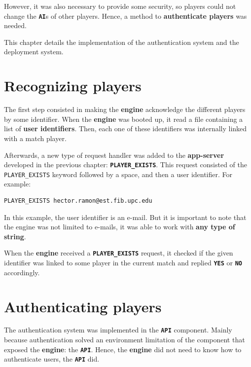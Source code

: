 \documentclass[a4paper,11pt,titlepage,abstract,numbers=noenddot,automark,mnsy,intlimits,rgb,dvipsnames]{report}
\begin{document}
However, it was also necessary to provide some security, so players could not change the \textbf{\texttt{AI}}s of other players. Hence,
a method to \textbf{authenticate players} was needed.

This chapter details the implementation of the authentication system and the deployment system.
\section{Recognizing players}
The first step consisted in making the \textbf{engine} acknowledge the different players by some identifier. When the \textbf{engine}
was booted up, it read a file containing a list of \textbf{user identifiers}. Then, each one of these identifiers was internally
linked with a match player.

Afterwards, a new type of request handler was added to the \textbf{app-server} developed in the previous chapter: \textbf{\texttt{PLAYER\_EXISTS}}.
This request consisted of the \texttt{PLAYER\_EXISTS} keyword followed by a space, and then a user identifier. For example:
\begin{verbatim}
PLAYER_EXISTS hector.ramon@est.fib.upc.edu
\end{verbatim}
In this example, the user identifier is an e-mail. But it is important to note that the engine was not limited to e-mails,
it was able to work with \textbf{any type of string}.

When the \textbf{engine} received a \textbf{\texttt{PLAYER\_EXISTS}} request, it checked if the given identifier was linked to some player in
the current match and replied \textbf{\texttt{YES}} or \textbf{\texttt{NO}} accordingly.
\section{Authenticating players}
The authentication system was implemented in the \textbf{\texttt{API}} component. Mainly because authentication solved an environment
limitation of the component that exposed the \textbf{engine}: the \textbf{\texttt{API}}. Hence, the \textbf{engine} did not need to know how to authenticate
users, the \textbf{\texttt{API}} did.
\end{document}

